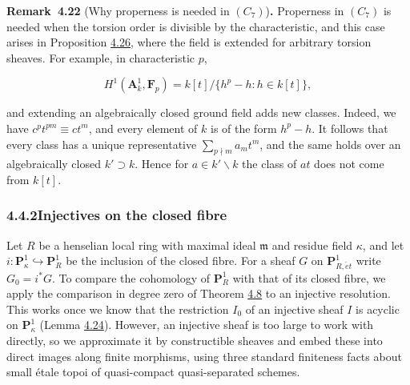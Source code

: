 \documentclass[11pt]{article}
\newenvironment{bpstatement}[2]{\par\addvspace{0.6\baselineskip}\noindent\textbf{#1}#2\textbf{.}\enspace\ignorespaces}
  {\par\addvspace{0.4\baselineskip}}
\begin{document}
\label{bp346}%
\begin{bpstatement}{Remark~4.22}{ (Why properness is needed in $(C_7)$)}
Properness in \((C_7)\) is needed when the torsion order is divisible by the characteristic, and this case arises in Proposition \hyperref[bp360]{4.26}, where the field is extended for arbitrary torsion sheaves. For example, in characteristic \(p\),

\[
H^1(\mathbf A^1_k,\mathbf F_p)
=k[t]/\{h^p-h:h\in k[t]\},
\]

and extending an algebraically closed ground field adds new classes. Indeed, we have \(c^pt^{pm}\equiv ct^m\), and every element of \(k\) is of the form \(h^p-h\). It follows that every class has a unique representative \(\sum_{p\nmid m}a_mt^m\), and the same holds over an algebraically closed \(k'\supset k\). Hence for \(a\in k'\smallsetminus k\) the class of \(at\) does not come from \(k[t]\).
\end{bpstatement}


\subsubsection*{\texorpdfstring{4.4.2\quad Injectives on the closed fibre}{4.4.2 Injectives on the closed fibre}}
\label{bp347}%
\label{bp348}%
Let \(R\) be a henselian local ring with maximal ideal \(\mathfrak m\) and residue field \(\kappa\), and let \(i:\mathbf P^1_\kappa\hookrightarrow\mathbf P^1_R\) be the inclusion of the closed fibre. For a sheaf \(G\) on \(\mathbf P^1_{R,\acute{e}t}\) write \(G_0=i^*G\). To compare the cohomology of \(\mathbf P^1_R\) with that of its closed fibre, we apply the comparison in degree zero of Theorem \hyperref[bp308]{4.8} to an injective resolution. This works once we know that the restriction \(I_0\) of an injective sheaf \(I\) is acyclic on \(\mathbf P^1_\kappa\) (Lemma \hyperref[bp352]{4.24}). However, an injective sheaf is too large to work with directly, so we approximate it by constructible sheaves and embed these into direct images along finite morphisms, using three standard finiteness facts about small étale topoi of quasi-compact quasi-separated schemes.
\end{document}
